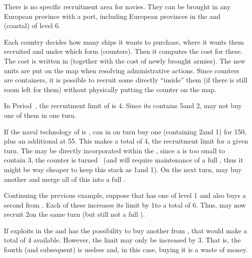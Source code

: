 There is no specific recruitment area for
navies. They can be brought in any European province with a port, including
European provinces in the \ROTW and (coastal) \COL of level 6.

\aparag[Recruitment.] Each country decides how many ships it wants to
purchase, where it wants them recruited and under which form (counters). Then
it computes the cost for these.
\bparag The cost is written in  (together with the
cost of newly brought armies).
\bparag The new units are put on the map when resolving administrative
actions.
\bparag Since \FLEET counters are containers, it is possible to recruit some
\ND directly ``inside'' them (if there is still room left for them) without
physically putting the \ND counter on the map.

\begin{exemple}
  In Period~, the recruitment limit of \SUE is 4\ND. Since its
  \FLEET\Faceplus contains 5\ND and 2\NTD, \SUE may not buy one of them in one
  turn.

  If the naval technology of \SUE is \TBAT, \SUE can in on turn buy one
  \FLEET\Facemoins (containing 2\ND and 1\NTD) for 150\ducats, plus an
  additional \NWD at 55\ducats. This makes a total of 4\ND, the recruitment
  limit for a given turn. The \NWD may be directly incorporated within the
  \FLEET, since a \FLEET\Facemoins is too small to contain 3\ND, the counter
  is turned ~\faceplus (and will require maintenance of a full
  \FLEET\Faceplus, thus it might be way cheaper to keep this stack as
  1\FLEET\Facemoins and 1\ND). On the next turn, \SUE may buy another
  \FLEET\Facemoins and merge all of this into a full \FLEET\Faceplus.
\end{exemple}

\begin{exemple}[Wood]
  Continuing the previous example, suppose that \SUE has one  \MNU
  of level 1 and also buys a second  from \ANG. Each of these
   increases its limit by 1\ND to a total of 6\ND. Thus, \SUE may
  now recruit 2\FLEET\Facemoins on the same turn (but still not a full
  \FLEET\Faceplus).

  If \SUE exploits  in the \ROTW and has the possibility to buy
  another  from \POL, that would make a total of 4 
  available. However, the limit may only be increased by 3\ND. That is, the
  fourth (and subsequent)  is useless and, in this case, buying it
  is a waste of money.
\end{exemple}

